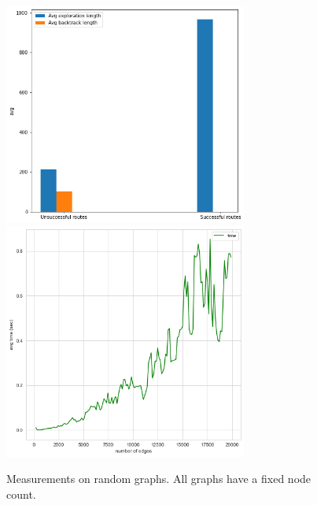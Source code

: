 \documentclass{article}
\begin{document}
\begin{figure}
  \includegraphics[width=8cm]{figures/random_uj/bar_plot_3.png}
  \hspace{1cm}
  \includegraphics[width=8cm]{figures/random_uj/edge_time.png}

  \caption{Measurements on random graphs. All graphs have a fixed node count.}
  \label{fig:random-results}
\end{figure}
\end{document}
